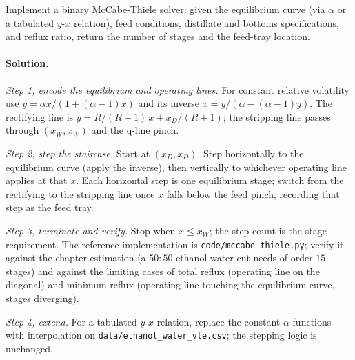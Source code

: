\begin{exercise}
Implement a binary McCabe-Thiele solver: given the equilibrium curve
(via $\alpha$ or a tabulated $y$-$x$ relation), feed conditions,
distillate and bottoms specifications, and reflux ratio, return the
number of stages and the feed-tray location.

\paragraph{Solution.}
\textit{Step 1, encode the equilibrium and operating lines.} For
constant relative volatility use $y = \alpha x/(1+(\alpha-1)x)$ and its
inverse $x = y/(\alpha-(\alpha-1)y)$. The rectifying line is $y =
R/(R+1)\,x + x_D/(R+1)$; the stripping line passes through $(x_W, x_W)$
and the q-line pinch.

\textit{Step 2, step the staircase.} Start at $(x_D, x_D)$. Step
horizontally to the equilibrium curve (apply the inverse), then
vertically to whichever operating line applies at that $x$. Each
horizontal step is one equilibrium stage; switch from the rectifying to
the stripping line once $x$ falls below the feed pinch, recording that
step as the feed tray.

\textit{Step 3, terminate and verify.} Stop when $x \le x_W$; the step
count is the stage requirement. The reference implementation is
\texttt{code/mccabe\_thiele.py}; verify it against the chapter
estimation (a $50:50$ ethanol-water cut needs of order $15$ stages) and
against the limiting cases of total reflux (operating line on the
diagonal) and minimum reflux (operating line touching the equilibrium
curve, stages diverging).

\textit{Step 4, extend.} For a tabulated $y$-$x$ relation, replace the
constant-$\alpha$ functions with interpolation on
\texttt{data/ethanol\_water\_vle.csv}; the stepping logic is unchanged.
\end{exercise}

